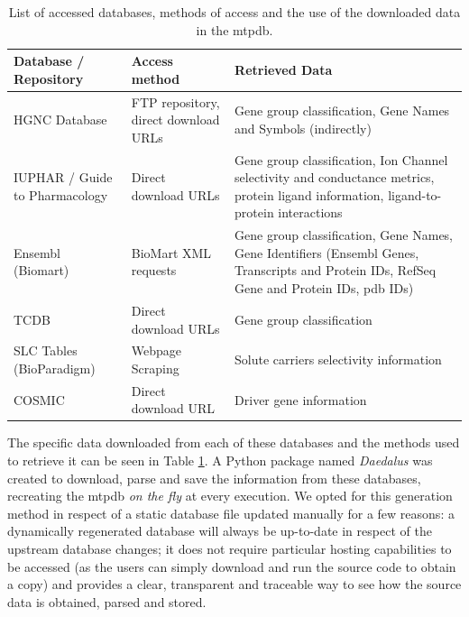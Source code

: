 \begin{table}
\begin{tabularx}{\textwidth}{|X|X|X|}
\hline
\textbf{Database / Repository }         & \textbf{Access method }                       & \textbf{Retrieved Data}                                                                                                                             \\ \hline \hline
HGNC Database                  & FTP repository, direct download URLs & Gene group classification, Gene Names and Symbols (indirectly)                                                                             \\ \hline
IUPHAR / Guide to Pharmacology & Direct download URLs                 & Gene group classification, Ion Channel selectivity and conductance metrics, protein ligand information, ligand-to-protein interactions     \\ \hline
Ensembl (Biomart)              & BioMart XML requests                 & Gene group classification, Gene Names, Gene Identifiers (Ensembl Genes, Transcripts and Protein IDs, RefSeq Gene and Protein IDs, pdb IDs) \\ \hline
TCDB                           & Direct download URLs                 & Gene group classification                                                                                                                  \\ \hline
SLC Tables (BioParadigm)       & Webpage Scraping                     & Solute carriers selectivity information                                                                                                    \\ \hline
COSMIC                         & Direct download URL                  & Driver gene information                                                                                                                    \\ \hline
\end{tabularx}%

\caption{List of accessed databases, methods of access and the use of the downloaded data in the \acrlong{mtpdb}.}
\label{tab:dataSources}
\end{table}

The specific data downloaded from each of these databases and the methods used to retrieve it can be seen in Table \ref{tab:dataSources}. A Python package named \textit{Daedalus} was created to download, parse and save the information from these databases, recreating the \gls{mtpdb} \textit{on the fly} at every execution. We opted for this generation method in respect of a static database file updated manually for a few reasons: a dynamically regenerated database will always be up-to-date in respect of the upstream database changes; it does not require particular hosting capabilities to be accessed (as the users can simply download and run the source code to obtain a copy) and provides a clear, transparent and traceable way to see how the source data is obtained, parsed and stored.

